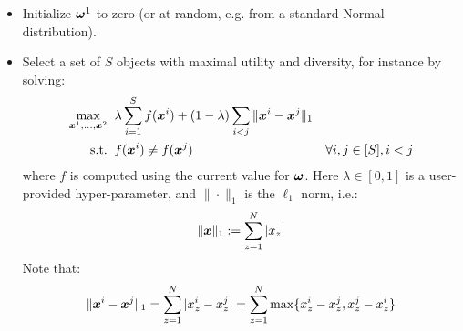 \documentclass[12pt,a4paper]{article}
\begin{document}
\begin{itemize}
\begin{itemize}
            \item Initialize $\boldsymbol{\omega}^1$ to zero (or at random, e.g. from a
                standard Normal distribution).

            \item Select a set of $S$ objects with maximal utility and
                diversity, for instance by solving:
                \begin{align*}
                    \max_{\boldsymbol{x}^1, \ldots, \boldsymbol{x}^2}
                        & \;\; \lambda \sum_{i=1}^S f(\boldsymbol{x}^i) + (1 - \lambda) \sum_{i < j} \|\boldsymbol{x}^i - \boldsymbol{x}^j\|_1 \\
                    \text{s.t.}
                        & \;\; f(\boldsymbol{x}^i) \ne f(\boldsymbol{x}^j)
                            & \forall i,j \in [S], i < j
                \end{align*}
                where $f$ is computed using the current value for $\boldsymbol{\omega}$.
                Here $\lambda \in [0, 1]$ is a user-provided hyper-parameter,
                and $\|\cdot\|_1$ is the $\ell_1$ norm, i.e.:
                $$ \|\boldsymbol{x}\|_1 := \sum_{z=1}^N |x_z| $$
                Note that:
                $$ \|\boldsymbol{x}^i - \boldsymbol{x}^j\|_1 = \sum_{z=1}^N |x^i_z - x^j_z| = \sum_{z=1}^N \max \{x^i_z - x^j_z, x^j_z - x^i_z\} $$


\end{itemize}
\end{itemize}
\end{document}
